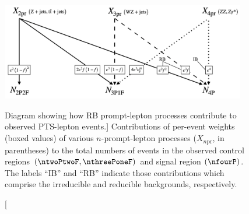 \begin{figure}[!htbp]
	\begin{center}
		\includegraphics[width=0.95\textwidth]{figures/higgsmassmeas/redbkg/promptwgts_to_CRSR.png}
		\caption
			[Diagram showing how RB prompt-lepton processes contribute to observed PTS-lepton events.]
			{
			Contributions of per-event weights (boxed values) of various $n$-prompt-lepton processes ($X_{n\text{pr}}$, in parentheses) to the total numbers of events in the observed control regions $\left( \ntwoPtwoF, \nthreePoneF \right)$ and signal region $\left( \nfourP \right)$.
			The labels ``IB'' and ``RB'' indicate those contributions which comprise the irreducible and reducible backgrounds, respectively.
			}
		\label{fig:prompt_to_crs}
	\end{center}
\end{figure}

